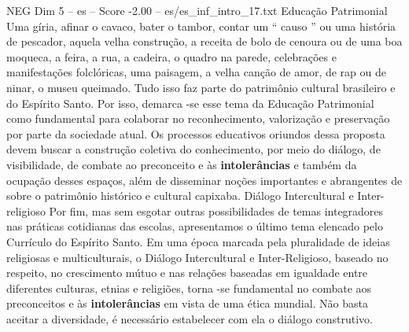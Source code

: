 \begin{textsample}{NEG Dim 5 – es – Score -2.00 – es/es\_inf\_intro\_17.txt}
Educação Patrimonial Uma gíria, afinar o cavaco, bater o tambor, contar um “ causo ” ou uma história de pescador, aquela velha construção, a receita de bolo de cenoura ou de uma boa moqueca, a feira, a rua, a cadeira, o quadro na parede, celebrações e manifestações folclóricas, uma paisagem, a velha canção de amor, de rap ou de ninar, o museu queimado.
Tudo isso faz parte do patrimônio cultural brasileiro e do Espírito Santo.
Por isso, demarca -se esse tema da Educação Patrimonial como fundamental para colaborar no reconhecimento, valorização e preservação por parte da sociedade atual.
Os processos educativos oriundos dessa proposta devem buscar a construção coletiva do conhecimento, por meio do diálogo, de visibilidade, de combate ao preconceito e às \textbf{intolerâncias} e também da ocupação desses espaços, além de disseminar noções importantes e abrangentes de sobre o patrimônio histórico e cultural capixaba.
Diálogo Intercultural e Inter-religioso Por fim, mas sem esgotar outras possibilidades de temas integradores nas práticas cotidianas das escolas, apresentamos o último tema elencado pelo Currículo do Espírito Santo.
Em uma época marcada pela pluralidade de ideias religiosas e multiculturais, o Diálogo Intercultural e Inter-Religioso, baseado no respeito, no crescimento mútuo e nas relações baseadas em igualdade entre diferentes culturas, etnias e religiões, torna -se fundamental no combate aos preconceitos e às \textbf{intolerâncias} em vista de uma ética mundial.
Não basta aceitar a diversidade, é necessário estabelecer com ela o diálogo construtivo.

\end{textsample}
